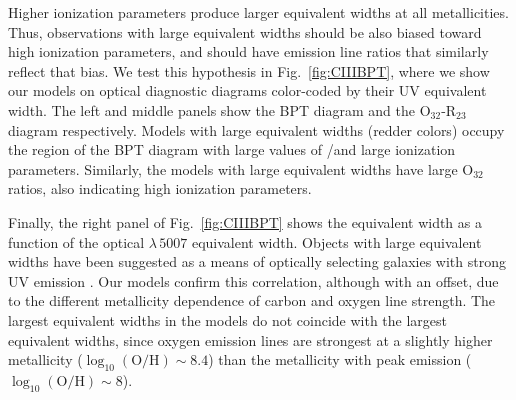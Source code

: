 Higher ionization parameters produce larger \ciii equivalent widths at all metallicities. Thus, observations with large \ciii equivalent widths should be also biased toward high ionization parameters, and should have emission line ratios that similarly reflect that bias. We test this hypothesis in Fig.~\ref{fig:CIIIBPT}, where we show our models on optical diagnostic diagrams color-coded by their UV \ciii equivalent width. The left and middle panels show the BPT diagram and the O$_{32}$-R$_{23}$ diagram respectively. Models with large \ciii equivalent widths (redder colors) occupy the region of the BPT diagram with large values of \oiii/\hb and large ionization parameters. Similarly, the models with large \ciii equivalent widths have large O$_{32}$ ratios, also indicating high ionization parameters.

Finally, the right panel of Fig.~\ref{fig:CIIIBPT} shows the \ciii equivalent width as a function of the optical \oiii$\lambda\,5007$ equivalent width. Objects with large \oiii equivalent widths have been suggested as a means of optically selecting galaxies with strong UV \ciii emission \citep{Berg+2016, Senchyna+2017}. Our models confirm this correlation, although with an offset, due to the different metallicity dependence of carbon and oxygen line strength. The largest \ciii equivalent widths in the models do not coincide with the largest \oiii equivalent widths, since oxygen emission lines are strongest at a slightly higher metallicity ($\log_{10}(\mathrm{O}/\mathrm{H})\sim 8.4$) than the metallicity with peak \ciii emission ($\log_{10}(\mathrm{O}/\mathrm{H})\sim 8$). 


